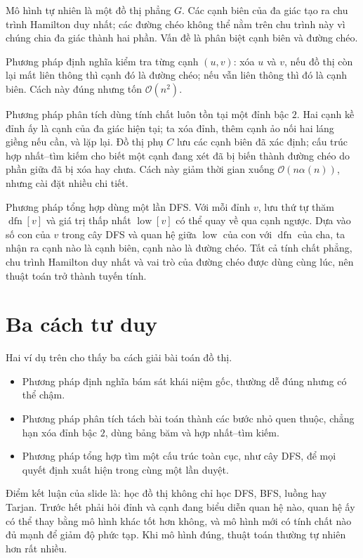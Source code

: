 \documentclass[11pt]{article}
\newcommand{\Oh}{\mathcal{O}}
\begin{document}
Mô hình tự nhiên là một đồ thị phẳng \(G\). Các cạnh biên của đa giác tạo ra
chu trình Hamilton duy nhất; các đường chéo không thể nằm trên chu trình này
vì chúng chia đa giác thành hai phần. Vấn đề là phân biệt cạnh biên và đường
chéo.

Phương pháp định nghĩa kiểm tra từng cạnh \((u,v)\): xóa \(u\) và \(v\), nếu
đồ thị còn lại mất liên thông thì cạnh đó là đường chéo; nếu vẫn liên thông
thì đó là cạnh biên. Cách này đúng nhưng tốn \(\Oh(n^2)\).

Phương pháp phân tích dùng tính chất luôn tồn tại một đỉnh bậc \(2\). Hai
cạnh kề đỉnh ấy là cạnh của đa giác hiện tại; ta xóa đỉnh, thêm cạnh ảo nối
hai láng giềng nếu cần, và lặp lại. Đồ thị phụ \(C\) lưu các cạnh biên đã xác
định; cấu trúc hợp nhất--tìm kiếm cho biết một cạnh đang xét đã bị biến thành
đường chéo do phần giữa đã bị xóa hay chưa. Cách này giảm thời gian xuống
\(\Oh(n\alpha(n))\), nhưng cài đặt nhiều chi tiết.

Phương pháp tổng hợp dùng một lần DFS. Với mỗi đỉnh \(v\), lưu thứ tự thăm
\(\operatorname{dfn}[v]\) và giá trị thấp nhất \(\operatorname{low}[v]\) có
thể quay về qua cạnh ngược. Dựa vào số con của \(v\) trong cây DFS và quan hệ
giữa \(\operatorname{low}\) của con với \(\operatorname{dfn}\) của cha, ta
nhận ra cạnh nào là cạnh biên, cạnh nào là đường chéo. Tất cả tính chất phẳng,
chu trình Hamilton duy nhất và vai trò của đường chéo được dùng cùng lúc, nên
thuật toán trở thành tuyến tính.

\section{Ba cách tư duy}

Hai ví dụ trên cho thấy ba cách giải bài toán đồ thị.
\begin{itemize}
  \item Phương pháp định nghĩa bám sát khái niệm gốc, thường dễ đúng nhưng có
  thể chậm.
  \item Phương pháp phân tích tách bài toán thành các bước nhỏ quen thuộc,
  chẳng hạn xóa đỉnh bậc \(2\), dùng bảng băm và hợp nhất--tìm kiếm.
  \item Phương pháp tổng hợp tìm một cấu trúc toàn cục, như cây DFS, để mọi
  quyết định xuất hiện trong cùng một lần duyệt.
\end{itemize}

Điểm kết luận của slide là: học đồ thị không chỉ học DFS, BFS, luồng hay
Tarjan. Trước hết phải hỏi đỉnh và cạnh đang biểu diễn quan hệ nào, quan hệ ấy
có thể thay bằng mô hình khác tốt hơn không, và mô hình mới có tính chất nào
đủ mạnh để giảm độ phức tạp. Khi mô hình đúng, thuật toán thường tự nhiên hơn
rất nhiều.
\end{document}
